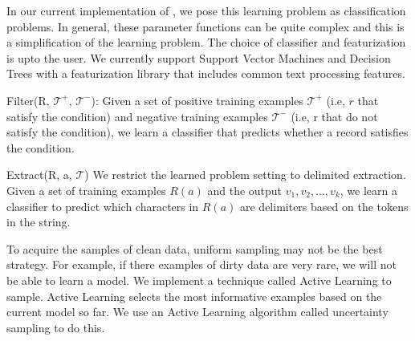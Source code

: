 In our current implementation of \projx, we pose this learning problem as classification problems.
In general, these parameter functions can be quite complex and this is a simplification of the learning problem.
The choice of classifier and featurization is upto the user. 
We currently support Support Vector Machines and Decision Trees with a featurization library that includes common text processing features.

\vspace{0.5em}

\noindent \textsf{Filter(R, $\mathcal{T}^+$, $\mathcal{T}^-$)}: Given a set of positive training examples $\mathcal{T}^+$ (i.e, $r$ that satisfy the condition) and
negative training examples $\mathcal{T}^-$ (i.e, r that do not satisfy the condition), we learn a classifier that predicts whether a record satisfies the condition. 

\vspace{0.5em}

\noindent \textsf{Extract(R, a, $\mathcal{T}$)} We restrict the learned problem setting to delimited extraction. Given a set of training examples $R(a)$ and the output $v_1,v_2,...,v_k$, we learn a classifier to predict which characters in $R(a)$ are delimiters based on the tokens in the string.

\vspace{1em}

To acquire the samples of clean data, uniform sampling may not be the best strategy.
For example, if there examples of dirty data are very rare, we will not be able to learn a model.
We implement a technique called Active Learning to sample.
Active Learning selects the most informative examples based on the current model so far.
We use an Active Learning algorithm called uncertainty sampling to do this.








